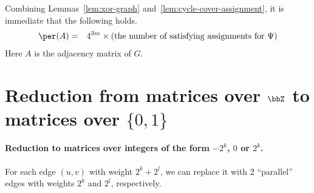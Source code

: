 \documentclass[11pt, a4paper]{article}
\begin{document}
Combining Lemmas~\ref{lem:xor-graph} and~\ref{lem:cycle-cover-assignment},
it is immediate that the following holds.
\begin{eqnarray*}
\per(A) & = & 4^{3m}\times(\text{the number of satisfying assignments for}\ \Psi)
\end{eqnarray*}
Here $A$ is the adjacency matrix of $G$.



\section{Reduction from matrices over $\bbZ$ to matrices over $\{0,1\}$}
\label{sec:red-Z-to-01}

\paragraph*{Reduction to matrices over integers of the form $-2^k$, $0$ or $2^k$.}
For each edge $(u,v)$ with weight $2^{k}+ 2^{l}$,
we can replace it with $2$ ``parallel'' edges with weights $2^k$ and $2^l$, respectively.
\begin{center}
\end{center}
\end{document}
